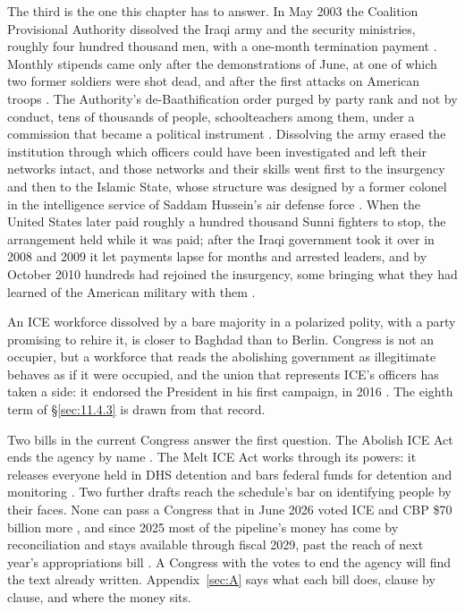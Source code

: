 The third is the one this chapter has to answer. In May 2003 the Coalition Provisional Authority dissolved the Iraqi army and the security ministries, roughly four hundred thousand men, with a one-month termination payment \autocite{cpa2003order2}. Monthly stipends came only after the demonstrations of June, at one of which two former soldiers were shot dead, and after the first attacks on American troops \autocite[158]{allawi2007occupation}. The Authority's de-Baathification order purged by party rank and not by conduct, tens of thousands of people, schoolteachers among them, under a commission that became a political instrument \autocite{cpa2003order1,sissons2013bitter}. Dissolving the army erased the institution through which officers could have been investigated and left their networks intact, and those networks and their skills went first to the insurgency and then to the Islamic State, whose structure was designed by a former colonel in the intelligence service of Saddam Hussein's air defense force \autocite{reuter2015terror}. When the United States later paid roughly a hundred thousand Sunni fighters to stop, the arrangement held while it was paid; after the Iraqi government took it over in 2008 and 2009 it let payments lapse for months and arrested leaders, and by October 2010 hundreds had rejoined the insurgency, some bringing what they had learned of the American military with them \autocite{williams2010sunnis}.

An ICE workforce dissolved by a bare majority in a polarized polity, with a party promising to rehire it, is closer to Baghdad than to Berlin. Congress is not an occupier, but a workforce that reads the abolishing government as illegitimate behaves as if it were occupied, and the union that represents ICE's officers has taken a side: it endorsed the President in his first campaign, in 2016 \autocite{porter2016iceunion}. The eighth term of \S\ref{sec:11.4.3} is drawn from that record.

Two bills in the current Congress answer the first question. The Abolish ICE Act ends the agency by name \autocite{hr7123}. The Melt ICE Act works through its powers: it releases everyone held in DHS detention and bars federal funds for detention and monitoring \autocite{hr7190}. Two further drafts reach the schedule's bar on identifying people by their faces. None can pass a Congress that in June 2026 voted ICE and CBP \$70 billion more \autocite{GT2026SecureAmerica}, and since 2025 most of the pipeline's money has come by reconciliation and stays available through fiscal 2029, past the reach of next year's appropriations bill \autocite{obbba2025}. A Congress with the votes to end the agency will find the text already written. Appendix~\ref{sec:A} says what each bill does, clause by clause, and where the money sits.
